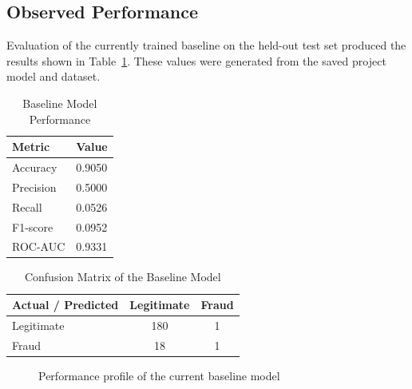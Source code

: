 \documentclass[a4paper,12pt]{article}
\begin{document}
\subsection{Observed Performance}
Evaluation of the currently trained baseline on the held-out test set produced the results shown in Table~\ref{tab:metrics}. These values were generated from the saved project model and dataset.

\begin{table}[H]
\centering
\caption{Baseline Model Performance}
\label{tab:metrics}
\begin{tabular}{p{5cm} p{3cm}}
\toprule
\textbf{Metric} & \textbf{Value} \\
\midrule
Accuracy & 0.9050 \\
Precision & 0.5000 \\
Recall & 0.0526 \\
F1-score & 0.0952 \\
ROC-AUC & 0.9331 \\
\bottomrule
\end{tabular}
\end{table}

\begin{table}[H]
\centering
\caption{Confusion Matrix of the Baseline Model}
\begin{tabular}{lcc}
\toprule
\textbf{Actual / Predicted} & \textbf{Legitimate} & \textbf{Fraud} \\
\midrule
Legitimate & 180 & 1 \\
Fraud & 18 & 1 \\
\bottomrule
\end{tabular}
\end{table}

\begin{figure}[H]
\centering
{}
\caption{Performance profile of the current baseline model}
\end{figure}
\end{document}
